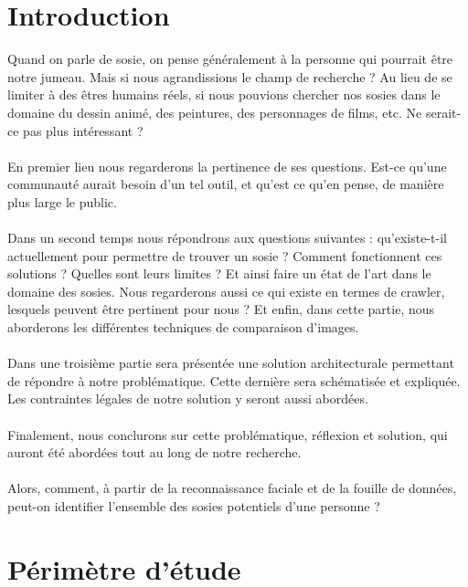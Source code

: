 \documentclass[a4paper,12pt]{article}
\begin{document}
\newpage
{}

\section*{Introduction}
Quand on parle de sosie, on pense généralement à la personne qui pourrait être notre jumeau. Mais si nous agrandissions le champ de recherche ? Au lieu de se limiter à des êtres humains réels, si nous pouvions chercher nos sosies dans le domaine du dessin animé, des peintures, des personnages de films, etc. Ne serait-ce pas plus intéressant ? 
\\\\
En premier lieu nous regarderons la pertinence de ses questions. Est-ce qu'une communauté aurait besoin d'un tel outil, et qu'est ce qu'en pense, de manière plus large le public. 
\\\\
Dans un second temps nous répondrons aux questions suivantes : qu'existe-t-il actuellement pour permettre de trouver un sosie ? Comment fonctionnent ces solutions ? Quelles sont leurs limites ? Et ainsi faire un état de l'art dans le domaine des sosies. Nous regarderons aussi ce qui existe en termes de crawler, lesquels peuvent être pertinent pour nous ? Et enfin, dans cette partie, nous aborderons les différentes techniques de comparaison d'images. 
\\\\
Dans une troisième partie sera présentée une solution architecturale permettant de répondre à notre problématique. Cette dernière sera schématisée et expliquée. Les contraintes légales de notre solution y seront aussi abordées. 
\\\\
Finalement, nous conclurons sur cette problématique, réflexion et solution, qui auront été abordées tout au long de notre recherche. 
\\\\
Alors, comment, à partir de la reconnaissance faciale et de la fouille de données, peut-on identifier l’ensemble des sosies potentiels d’une personne ?


\newpage
\section{Périmètre d'étude}
\end{document}
